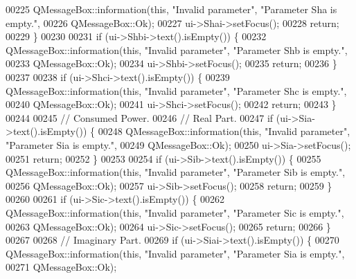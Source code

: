 \begin{DoxyCode}
00225     QMessageBox::information(\textcolor{keyword}{this}, \textcolor{stringliteral}{"Invalid parameter"}, \textcolor{stringliteral}{"Parameter Sha is empty."},
00226                              QMessageBox::Ok);
00227     ui->Shai->setFocus();
00228     \textcolor{keywordflow}{return};
00229   \}
00230 
00231   \textcolor{keywordflow}{if} (ui->Shbi->text().isEmpty()) \{
00232     QMessageBox::information(\textcolor{keyword}{this}, \textcolor{stringliteral}{"Invalid parameter"}, \textcolor{stringliteral}{"Parameter Shb is empty."},
00233                              QMessageBox::Ok);
00234     ui->Shbi->setFocus();
00235     \textcolor{keywordflow}{return};
00236   \}
00237 
00238   \textcolor{keywordflow}{if} (ui->Shci->text().isEmpty()) \{
00239     QMessageBox::information(\textcolor{keyword}{this}, \textcolor{stringliteral}{"Invalid parameter"}, \textcolor{stringliteral}{"Parameter Shc is empty."},
00240                              QMessageBox::Ok);
00241     ui->Shci->setFocus();
00242     \textcolor{keywordflow}{return};
00243   \}
00244 
00245   \textcolor{comment}{// Consumed Power.}
00246   \textcolor{comment}{// Real Part.}
00247   \textcolor{keywordflow}{if} (ui->Sia->text().isEmpty()) \{
00248     QMessageBox::information(\textcolor{keyword}{this}, \textcolor{stringliteral}{"Invalid parameter"}, \textcolor{stringliteral}{"Parameter Sia is empty."},
00249                              QMessageBox::Ok);
00250     ui->Sia->setFocus();
00251     \textcolor{keywordflow}{return};
00252   \}
00253 
00254   \textcolor{keywordflow}{if} (ui->Sib->text().isEmpty()) \{
00255     QMessageBox::information(\textcolor{keyword}{this}, \textcolor{stringliteral}{"Invalid parameter"}, \textcolor{stringliteral}{"Parameter Sib is empty."},
00256                              QMessageBox::Ok);
00257     ui->Sib->setFocus();
00258     \textcolor{keywordflow}{return};
00259   \}
00260 
00261   \textcolor{keywordflow}{if} (ui->Sic->text().isEmpty()) \{
00262     QMessageBox::information(\textcolor{keyword}{this}, \textcolor{stringliteral}{"Invalid parameter"}, \textcolor{stringliteral}{"Parameter Sic is empty."},
00263                              QMessageBox::Ok);
00264     ui->Sic->setFocus();
00265     \textcolor{keywordflow}{return};
00266   \}
00267 
00268   \textcolor{comment}{// Imaginary Part.}
00269   \textcolor{keywordflow}{if} (ui->Siai->text().isEmpty()) \{
00270     QMessageBox::information(\textcolor{keyword}{this}, \textcolor{stringliteral}{"Invalid parameter"}, \textcolor{stringliteral}{"Parameter Sia is empty."},
00271                              QMessageBox::Ok);

\end{DoxyCode}
